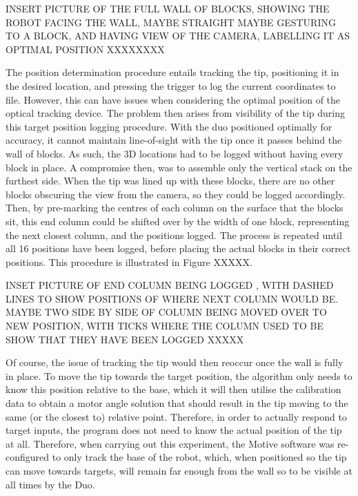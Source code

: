 \documentclass[11pt]{article}
\begin{document}
INSERT PICTURE OF THE FULL WALL OF BLOCKS, SHOWING THE ROBOT FACING THE WALL, MAYBE STRAIGHT MAYBE GESTURING TO A BLOCK, AND HAVING VIEW OF THE CAMERA, LABELLING IT AS OPTIMAL POSITION XXXXXXXX




The position determination procedure entails tracking the tip, positioning it in the desired location, and pressing the trigger to log the current coordinates to file. However, this can have issues when considering the optimal position of the optical tracking device. The problem then arises from visibility of the tip during this target position logging procedure. With the duo positioned optimally for accuracy, it cannot maintain line-of-sight with the tip once it passes behind the wall of blocks. As such, the 3D locations had to be logged without having every block in place. A compromise then, was to assemble only the vertical stack on the furthest side. When the tip was lined up with these blocks, there are no other blocks obscuring the view from the camera, so they could be logged accordingly. Then, by pre-marking the centres of each column on the surface that the blocks sit, this end column could be shifted over by the width of one block, representing the next closest column, and the positions logged. The process is repeated until all 16 positions have been logged, before placing the actual blocks in their correct positions. This procedure is illustrated in Figure XXXXX.

INSET PICTURE OF END COLUMN BEING LOGGED , WITH DASHED LINES TO SHOW POSITIONS OF WHERE NEXT COLUMN WOULD BE. MAYBE TWO SIDE BY SIDE OF COLUMN BEING MOVED OVER TO NEW POSITION, WITH TICKS WHERE THE COLUMN USED TO BE SHOW THAT THEY HAVE BEEN LOGGED XXXXX

Of course, the issue of tracking the tip would then reoccur once the wall is fully in place. To move the tip towards the target position, the algorithm only needs to know this position relative to the base, which it will then utilise the calibration data to obtain a motor angle solution that should result in the tip moving to the same (or the closest to) relative point. Therefore, in order to actually respond to target inputs, the program does not need to know the actual position of the tip at all. Therefore, when carrying out this experiment, the Motive software was re-configured to only track the base of the robot, which, when positioned so the tip can move towards targets, will remain far enough from the wall so to be visible at all times by the Duo. 
\end{document}
